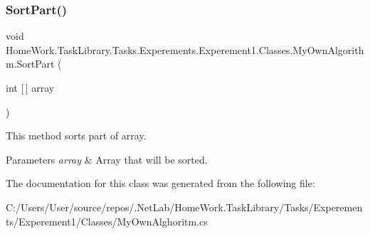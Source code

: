 \subsubsection{\texorpdfstring{SortPart()}{SortPart()}}
{\footnotesize\ttfamily void Home\+Work.\+Task\+Library.\+Tasks.\+Experements.\+Experement1.\+Classes.\+My\+Own\+Algorithm.\+Sort\+Part (\begin{DoxyParamCaption}\item[{int \mbox{[}$\,$\mbox{]}}]{array }\end{DoxyParamCaption})\hspace{0.3cm}{\ttfamily [private]}}



This method sorts part of array. 


\begin{DoxyParams}{Parameters}
{\em array} & Array that will be sorted.\\
\hline
\end{DoxyParams}


The documentation for this class was generated from the following file\+:\begin{DoxyCompactItemize}
\item 
C\+:/\+Users/\+User/source/repos/.\+Net\+Lab/\+Home\+Work.\+Task\+Library/\+Tasks/\+Experements/\+Experement1/\+Classes/My\+Own\+Alghoritm.\+cs\end{DoxyCompactItemize}
